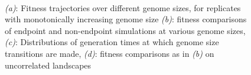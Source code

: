 \documentclass[paper=a4, fontsize=11pt,twoside]{scrartcl}       %
\begin{document}
\begin{figure}[h!]
        \centering                                                                                                                                                  
         \\                                                                                                       \caption{\textit{(a)}: Fitness trajectories over different genome sizes, for replicates with monotonically increasing genome size \textit{(b)}: fitness comparisons of endpoint and non-endpoint simulations at various genome sizes, \textit{(c)}: Distributions of generation times at which genome size transitions are made, \textit{(d)}: fitness comparisons as in \textit{(b)} on uncorrelated landscapes}
        \label{intermediate_epistasis}
\end{figure}
\end{document}
